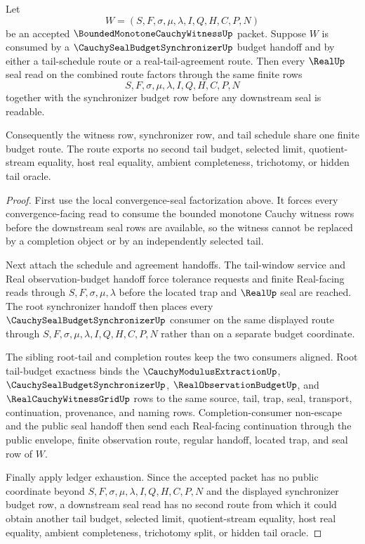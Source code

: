 \begin{theorem}
\label{thm:bounded-monotone-cauchy-witness-shared-budget-meet}
Let
$$
W=(S,F,\sigma,\mu,\lambda,I,Q,H,C,P,N)
$$
be an accepted $\BoundedMonotoneCauchyWitnessUp$ packet. Suppose $W$ is consumed by a $\CauchySealBudgetSynchronizerUp$ budget handoff and by either a tail-schedule route or a real-tail-agreement route. Then every $\RealUp$ seal read on the combined route factors through the same finite rows
$$
S,F,\sigma,\mu,\lambda,I,Q,H,C,P,N
$$
together with the synchronizer budget row before any downstream seal is readable.

Consequently the witness row, synchronizer row, and tail schedule share one finite budget route. The route exports no second tail budget, selected limit, quotient-stream equality, host real equality, ambient completeness, trichotomy, or hidden tail oracle.
\end{theorem}
\begin{proof}
First use the local convergence-seal factorization above. It forces every convergence-facing read to consume the bounded monotone Cauchy witness rows before the downstream seal rows are available, so the witness cannot be replaced by a completion object or by an independently selected tail.

Next attach the schedule and agreement handoffs. The tail-window service and Real observation-budget handoff force tolerance requests and finite Real-facing reads through $S,F,\sigma,\mu,\lambda$ before the located trap and $\RealUp$ seal are reached. The root synchronizer handoff then places every $\CauchySealBudgetSynchronizerUp$ consumer on the same displayed route through $S,F,\sigma,\mu,\lambda,I,Q,H,C,P,N$ rather than on a separate budget coordinate.

The sibling root-tail and completion routes keep the two consumers aligned. Root tail-budget exactness binds the $\CauchyModulusExtractionUp$, $\CauchySealBudgetSynchronizerUp$, $\RealObservationBudgetUp$, and $\RealCauchyWitnessGridUp$ rows to the same source, tail, trap, seal, transport, continuation, provenance, and naming rows. Completion-consumer non-escape and the public seal handoff then send each Real-facing continuation through the public envelope, finite observation route, regular handoff, located trap, and seal row of $W$.

Finally apply ledger exhaustion. Since the accepted packet has no public coordinate beyond $S,F,\sigma,\mu,\lambda,I,Q,H,C,P,N$ and the displayed synchronizer budget row, a downstream seal read has no second route from which it could obtain another tail budget, selected limit, quotient-stream equality, host real equality, ambient completeness, trichotomy split, or hidden tail oracle.
\end{proof}

